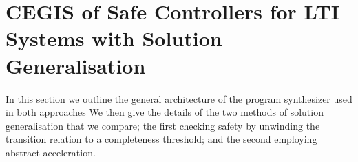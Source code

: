 \documentclass[runningheads,a4paper]{llncs}
\begin{document}



\section{CEGIS of Safe Controllers for LTI Systems with Solution Generalisation} 
\label{sec:CEGARIS} 
In this section we outline the general architecture of the program synthesizer used in both approaches%
We then give the details of the two methods of solution generalisation that we compare; the first checking safety by unwinding the transition relation to a completeness threshold; and the second employing abstract acceleration.
 
\end{document}

